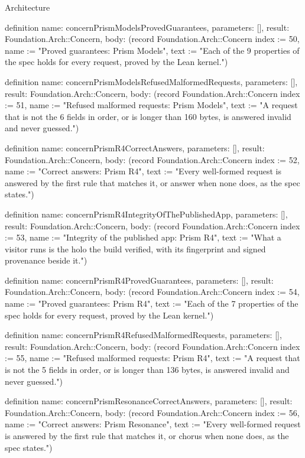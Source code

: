 \begin{lexlean}{Architecture}
\begin{semanticmodule}
definition{
  name: concernPrismModelsProvedGuarantees,
  parameters: [],
  result: Foundation.Arch::Concern,
  body: (record Foundation.Arch::Concern {index := 50, name := "Proved guarantees: Prism Models", text := "Each of the 9 properties of the spec holds for every request, proved by the Lean kernel."})
}

definition{
  name: concernPrismModelsRefusedMalformedRequests,
  parameters: [],
  result: Foundation.Arch::Concern,
  body: (record Foundation.Arch::Concern {index := 51, name := "Refused malformed requests: Prism Models", text := "A request that is not the 6 fields in order, or is longer than 160 bytes, is answered invalid and never guessed."})
}

definition{
  name: concernPrismR4CorrectAnswers,
  parameters: [],
  result: Foundation.Arch::Concern,
  body: (record Foundation.Arch::Concern {index := 52, name := "Correct answers: Prism R4", text := "Every well-formed request is answered by the first rule that matches it, or answer when none does, as the spec states."})
}

definition{
  name: concernPrismR4IntegrityOfThePublishedApp,
  parameters: [],
  result: Foundation.Arch::Concern,
  body: (record Foundation.Arch::Concern {index := 53, name := "Integrity of the published app: Prism R4", text := "What a visitor runs is the holo the build verified, with its fingerprint and signed provenance beside it."})
}

definition{
  name: concernPrismR4ProvedGuarantees,
  parameters: [],
  result: Foundation.Arch::Concern,
  body: (record Foundation.Arch::Concern {index := 54, name := "Proved guarantees: Prism R4", text := "Each of the 7 properties of the spec holds for every request, proved by the Lean kernel."})
}

definition{
  name: concernPrismR4RefusedMalformedRequests,
  parameters: [],
  result: Foundation.Arch::Concern,
  body: (record Foundation.Arch::Concern {index := 55, name := "Refused malformed requests: Prism R4", text := "A request that is not the 5 fields in order, or is longer than 136 bytes, is answered invalid and never guessed."})
}

definition{
  name: concernPrismResonanceCorrectAnswers,
  parameters: [],
  result: Foundation.Arch::Concern,
  body: (record Foundation.Arch::Concern {index := 56, name := "Correct answers: Prism Resonance", text := "Every well-formed request is answered by the first rule that matches it, or chorus when none does, as the spec states."})
}


\end{semanticmodule}
\end{lexlean}
